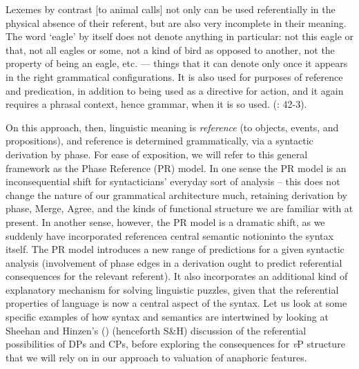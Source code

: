 \documentclass[output=paper
,modfonts
,nonflat
]{langsci/langscibook}
\begin{document}
\begin{displayquote}

\begin{small}

Lexemes by contrast [to animal calls] not only can be used referentially in the physical absence of their referent, but are also very incomplete in their meaning. The word ‘eagle’ by itself does not denote anything in particular: not this eagle or that, not all eagles or some, not a kind of bird as opposed to another, not the property of being an eagle, etc. — things that it can denote only once it appears in the right grammatical configurations. It is also used for purposes of reference and predication, in addition to being used as a directive for action, and it again requires a phrasal context, hence grammar, when it is so used. (\citealt{HinzenSheehan:2013}: 42-3). 

\end{small}

\end{displayquote}

On this approach, then, linguistic meaning is \textit{reference} (to objects, events, and propositions), and reference is determined grammatically, via a syntactic derivation by phase. For ease of exposition, we will refer to this general framework as the Phase Reference (PR) model. In one sense the PR model is an inconsequential shift for syntacticians’ everyday sort of analysis – this does not change the nature of our grammatical architecture much, retaining derivation by phase, Merge, Agree, and the kinds of functional structure we are familiar with at present. In another sense, however, the PR model is a dramatic shift, as we suddenly have incorporated reference\textemdash a central semantic notion\textemdash into the syntax itself. The PR model introduces a new range of predictions for a given syntactic analysis (involvement of phase edges in a derivation ought to predict referential consequences for the relevant referent). It also incorporates an additional kind of explanatory mechanism for solving linguistic puzzles, given that the referential properties of language is now a central aspect of the syntax. Let us look at some specific examples of how syntax and semantics are intertwined by looking at Sheehan and Hinzen’s (\citeyear{SheehanHinzen:2011}) (henceforth S\&H) discussion of the referential possibilities of DPs and CPs, before exploring the consequences for \textit{v}P structure that we will rely on in our approach to valuation of anaphoric features.  
\end{document}
